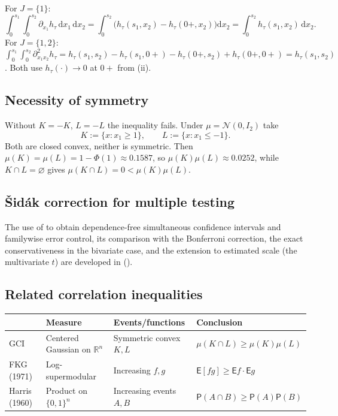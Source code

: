 \documentclass[12pt,a4paper]{article}
\theoremstyle{definition}
\newcommand{\R}{\mathbb{R}}
\newcommand{\PP}{\mathsf{P}}
\newcommand{\EE}{\mathsf{E}}
\newcommand{\dd}{\mathrm{d}}
\newcommand{\caln}{\mathcal{N}}
\begin{document}
For $J=\{1\}$:
\[
  \int_0^{s_1}\!\!\int_0^{s_2}\partial_{x_1}h_\tau\,\dd x_1\,\dd x_2
  =\int_0^{s_2}\bigl(h_\tau(s_1,x_2)-h_\tau(0+,x_2)\bigr)\dd x_2
  =\int_0^{s_2}h_\tau(s_1,x_2)\,\dd x_2.
\]
For $J=\{1,2\}$:
$\int_0^{s_1}\!\int_0^{s_2}\partial^2_{x_1x_2}h_\tau=h_\tau(s_1,s_2)
-h_\tau(s_1,0+)-h_\tau(0+,s_2)+h_\tau(0+,0+)=h_\tau(s_1,s_2)$.
Both use $h_\tau(\cdot)\to 0$ at $0+$ from (ii).

\subsection{Necessity of symmetry}\label{note:symmetry}

Without $K=-K$, $L=-L$ the inequality fails.  Under $\mu=\caln(0,I_2)$
take
\[
  K:=\{x:x_1\geqslant 1\},
  \qquad
  L:=\{x:x_1\leqslant -1\}.
\]
Both are closed convex, neither is symmetric.  Then
$\mu(K)=\mu(L)=1-\Phi(1)\approx 0.1587$, so
$\mu(K)\mu(L)\approx 0.0252$, while $K\cap L=\varnothing$ gives
$\mu(K\cap L)=0<\mu(K)\mu(L)$.

\subsection{\v{S}id\'ak correction for multiple testing}\label{note:fwer}

The use of  to obtain dependence-free simultaneous
confidence intervals and familywise error control, its comparison with
the Bonferroni correction, the exact conservativeness in the bivariate
case, and the extension to estimated scale (the multivariate $t$) are
developed in  ().

\subsection{Related correlation inequalities}\label{note:correlations}

\begin{center}
\renewcommand{\arraystretch}{1.3}
\begin{tabular}{llll}
\hline
 & \textbf{Measure} & \textbf{Events/functions} & \textbf{Conclusion} \\
\hline
GCI & Centered Gaussian on $\R^n$ & Symmetric convex $K,L$
 & $\mu(K\cap L)\geqslant\mu(K)\mu(L)$ \\
FKG (1971) & Log-supermodular & Increasing $f,g$
 & $\EE[fg]\geqslant\EE f\cdot\EE g$ \\
Harris (1960) & Product on $\{0,1\}^n$ & Increasing events $A,B$
 & $\PP(A\cap B)\geqslant\PP(A)\PP(B)$ \\
\hline
\end{tabular}
\end{center}
\end{document}
